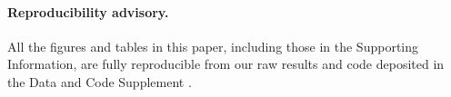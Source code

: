\documentclass[a4paper,12pt]{article}
\newcommand{\TODO}[1]{ {\tt \color{red} [TODO:#1] } }
\newcommand{\m}{m}
\newcommand{\specstat}{\ensuremath{\Psi}}
\newcommand{\Xk}{\ensuremath{X_K}}
\begin{document}
%
%
%

%
%

	\paragraph{Reproducibility advisory.} 
	All the figures and tables in this paper, including those in the
	Supporting Information, are fully reproducible from our
	raw results and code deposited in the Data and Code Supplement 
	\cite{SDR}.
\end{document}
